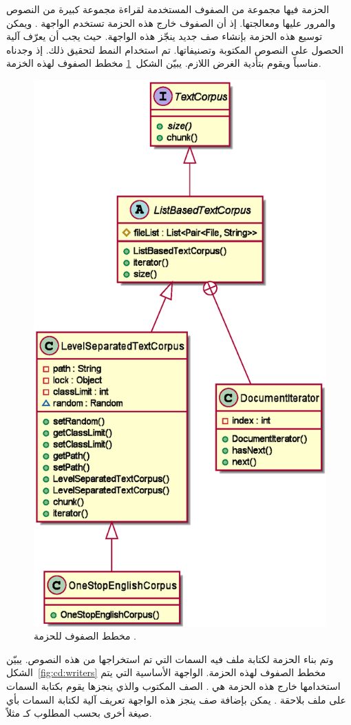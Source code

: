 الحزمة  فيها مجموعة من الصفوف المستخدمة لقراءة مجموعة كبيرة من النصوص والمرور عليها ومعالجتها.
إذ أن الصفوف خارج هذه الحزمة تستخدم الواجهة .
ويمكن توسيع هذه الحزمة بإنشاء صف جديد ينجّز هذه الواجهة.
حيث يجب أن يعرّف آلية الحصول على النصوص المكتوبة وتصنيفاتها.
تم استخدام النمط  لتحقيق ذلك.
إذ وجدناه مناسباً ويقوم بتأدية الغرض اللازم.
يبيّن الشكل~\ref{fig:cd:corpora} مخطط الصفوف لهذه الخزمة.

\begin{figure}[htb]
	\centering
	\includegraphics[width=0.6\linewidth]{images/cd-corpora.eps}
	\caption{%
		مخطط الصفوف للحزمة .
	}
	\label{fig:cd:corpora}
\end{figure}

وتم بناء الحزمة  لكتابة ملف فيه السمات التي تم استخراجها من هذه النصوص.
يبيّن الشكل~\ref{fig:cd:writers} مخطط الصفوف لهذه الحزمة.
الواجهة الأساسية التي يتم استخدامها خارج هذه الحزمة هي .
الصف المكتوب والذي ينجزها يقوم بكتابة السمات على ملف بلاحقة .
يمكن بإضافة صف ينجز هذه الواجهة تعريف آلية لكتابة السمات بأي صيغة أخرى بحسب المطلوب كـ  مثلاً.

